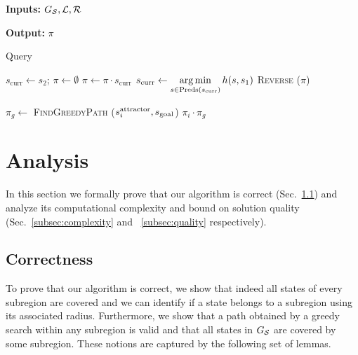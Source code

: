\documentclass[a4paper]{report}
\begin{document}
\begin{algorithm}[t]
\hspace*{\algorithmicindent} \textbf{Inputs:} $G_\mathcal{S}, \mathcal{L}, \mathcal{R}$

\hspace*{\algorithmicindent} \textbf{Output:} $\pi$	
\caption{Query}\label{alg:3}

\begin{algorithmic}[1]
  \label{alg:3:greedy-call-start}
  \State $s_{\text{curr}} \leftarrow s_2$; \hspace{2mm} $\pi \leftarrow \emptyset$
   \label{alg:3:while}
    \State $\pi \leftarrow \pi \cdot s_{\text{curr}}$
      \State $s_{\text{curr}} \leftarrow \operatorname*{arg\,min}\limits_{s \in \text{Preds}(s_{\text{curr}})} h(s, s_1)$  
    \EndWhile
    \State \Return \textsc{Reverse} ($\pi$)   
\EndProcedure
\label{alg:3:greedy-call-end}

\vspace{2mm}

    \label{alg:3:covers}
      \State $\pi_g \leftarrow$ \textsc{FindGreedyPath} ($s^{\text{attractor}}_i, s_{\text{goal}}$)
      \label{alg:3:greedy-call}
      \State \Return $\pi_i \cdot \pi_g$  
      \label{alg:3:return}
    \EndIf
  \EndFor

\EndProcedure
\end{algorithmic}
\end{algorithm}


\section{Analysis}
\label{sec:analysis1}
In this section we formally prove that 
our algorithm is correct (Sec.~\ref{subsec:correct}) and 
analyze its computational complexity and bound on solution quality (Sec.~\ref{subsec:complexity} and ~\ref{subsec:quality} respectively).

\subsection{Correctness}
\label{subsec:correct}
To prove that our algorithm is correct, we show that indeed all states of every subregion are covered and we can identify if a state belongs to a subregion using its associated radius.
Furthermore, we show that a path obtained by a greedy search within any subregion is valid and that all states in $G_\mathcal{S}$ are covered by some subregion.
These notions are captured by the following set of lemmas.
\end{document}
